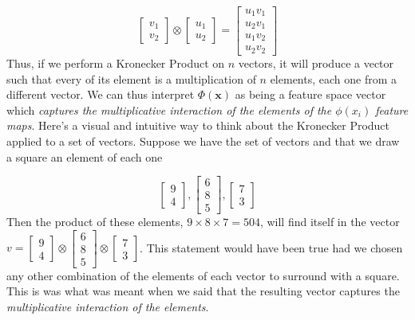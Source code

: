 \documentclass{article}
\theoremstyle{definition}
\theoremstyle{definition}
\begin{document}
\[
    \begin{bmatrix}
        v_1 \\ v_2
    \end{bmatrix}
    \otimes
    \begin{bmatrix}
        u_1 \\ u_2
    \end{bmatrix}
    =
    \begin{bmatrix}
        u_1 v_1 \\ u_2 v_1 \\ u_1v_2 \\ u_2v_2
    \end{bmatrix}
\]
Thus, if we perform a Kronecker Product on $n$ vectors, it will produce a vector such that every of its element is a multiplication of $n$ elements, each one from a different vector. We can thus interpret $\Phi(\mathbf{x})$ as being a feature space vector which \emph{captures the multiplicative interaction of the elements of the $\phi(x_i)$ feature maps}. Here's a visual and intuitive way to think about the Kronecker Product applied to a set of vectors. Suppose we have the set of vectors and that we draw a square an element of each one

\[
    \begin{bmatrix}
        \boxed{9} \\ 4
    \end{bmatrix},
    \begin{bmatrix}
        6 \\ \boxed{8} \\ 5
    \end{bmatrix},
    \begin{bmatrix}
        \boxed{7} \\ 3
    \end{bmatrix}
\]
Then the product of these elements,  $9\times8\times7=504$, will find itself in the vector $v=
    \begin{bmatrix}
        9 \\ 4
    \end{bmatrix}
    \otimes
    \begin{bmatrix}
        6 \\ 8 \\ 5
    \end{bmatrix}
    \otimes
    \begin{bmatrix}
        7 \\ 3
    \end{bmatrix}
$. This statement would have been true had we chosen any other combination of the elements of each vector to surround with a square. This is was what was meant when we said that the resulting vector captures the \emph{multiplicative interaction of the elements}.
\end{document}
